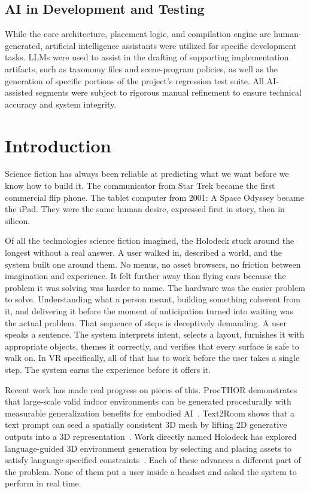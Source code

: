 \documentclass[12pt]{article}
\begin{document}
\subsection*{AI in Development and Testing}
While the core architecture, placement logic, and compilation engine are human-generated, artificial intelligence assistants were utilized for specific development tasks. LLMs were used to assist in the drafting of supporting implementation artifacts, such as taxonomy files and scene-program policies, as well as the generation of specific portions of the project's regression test suite. All AI-assisted segments were subject to rigorous manual refinement to ensure technical accuracy and system integrity.
\newpage

\section{Introduction}
Science fiction has always been reliable at predicting what we want before we know how to build it. The communicator from Star Trek became the first commercial flip phone. The tablet computer from 2001: A Space Odyssey became the iPad. They were the same human desire, expressed first in story, then in silicon.

Of all the technologies science fiction imagined, the Holodeck stuck around the longest without a real answer. A user walked in, described a world, and the system built one around them. No menus, no asset browsers, no friction between imagination and experience. It felt further away than flying cars because the problem it was solving was harder to name. The hardware was the easier problem to solve. Understanding what a person meant, building something coherent from it, and delivering it before the moment of anticipation turned into waiting was the actual problem.
That sequence of steps is deceptively demanding. A user speaks a sentence. The system interprets intent, selects a layout, furnishes it with appropriate objects, themes it correctly, and verifies that every surface is safe to walk on. In VR specifically, all of that has to work before the user takes a single step. The system earns the experience before it offers it.

Recent work has made real progress on pieces of this. ProcTHOR demonstrates that large-scale valid indoor environments can be generated procedurally with measurable generalization benefits for embodied AI~\cite{Deitke_2022_NeurIPS}. Text2Room shows that a text prompt can seed a spatially consistent 3D mesh by lifting 2D generative outputs into a 3D representation~\cite{hoellein2023text2room}. Work directly named Holodeck has explored language-guided 3D environment generation by selecting and placing assets to satisfy language-specified constraints~\cite{Yang_2024_CVPR}. Each of these advances a different part of the problem. None of them put a user inside a headset and asked the system to perform in real time.
\end{document}
